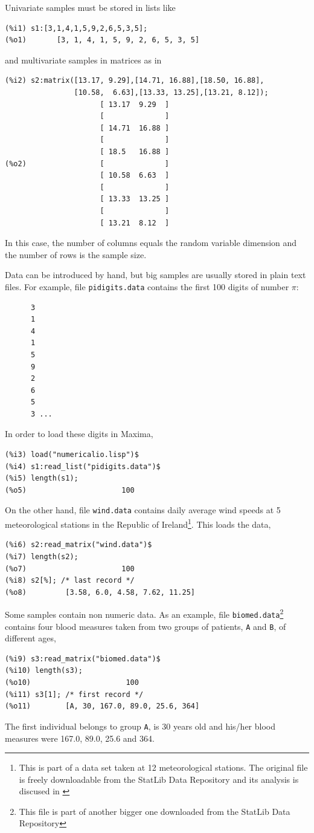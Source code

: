 \documentclass[12pt,a4paper]{article}
\begin{document}
Univariate samples must be stored in lists like
\begin{verbatim}
(%i1) s1:[3,1,4,1,5,9,2,6,5,3,5];
(%o1)       [3, 1, 4, 1, 5, 9, 2, 6, 5, 3, 5]
\end{verbatim}
and multivariate samples in matrices as in
\begin{verbatim}
(%i2) s2:matrix([13.17, 9.29],[14.71, 16.88],[18.50, 16.88],
                [10.58,  6.63],[13.33, 13.25],[13.21, 8.12]);
                      [ 13.17  9.29  ]
                      [              ]
                      [ 14.71  16.88 ]
                      [              ]
                      [ 18.5   16.88 ]
(%o2)                 [              ]
                      [ 10.58  6.63  ]
                      [              ]
                      [ 13.33  13.25 ]
                      [              ]
                      [ 13.21  8.12  ]
\end{verbatim}
In this case, the number of columns equals the random variable dimension and the number of rows is the sample size.

Data can be introduced by hand, but big samples are usually stored in plain text files. For example, file \verb|pidigits.data| contains the first 100 digits of number $\pi$:
\begin{verbatim}
      3
      1
      4
      1
      5
      9
      2
      6
      5
      3 ...
\end{verbatim}

In order to load these digits in Maxima,
\begin{verbatim}
(%i3) load("numericalio.lisp")$
(%i4) s1:read_list("pidigits.data")$
(%i5) length(s1);
(%o5)                      100
\end{verbatim}

On the other hand, file \verb|wind.data| contains daily average wind speeds at 5 meteorological stations in the Republic of Ireland\footnote{This is part of a data set taken at 12 meteorological stations. The original file is freely downloadable from the StatLib Data Repository and its analysis is discused in \cite{hasl}}. This loads the data,
\begin{verbatim}
(%i6) s2:read_matrix("wind.data")$
(%i7) length(s2);
(%o7)                      100
(%i8) s2[%]; /* last record */
(%o8)         [3.58, 6.0, 4.58, 7.62, 11.25]
\end{verbatim}

Some samples contain non numeric data. As an example, file \verb|biomed.data|\footnote{This file is part of another bigger one downloaded from the StatLib Data Repository} contains four blood measures taken from two groups of patients, \verb|A| and \verb|B|, of different ages,
\begin{verbatim}
(%i9) s3:read_matrix("biomed.data")$
(%i10) length(s3);
(%o10)                      100
(%i11) s3[1]; /* first record */
(%o11)        [A, 30, 167.0, 89.0, 25.6, 364]
\end{verbatim}
The first individual belongs to group \verb|A|, is 30 years old and his/her blood measures were 167.0, 89.0, 25.6 and 364.
\end{document}
